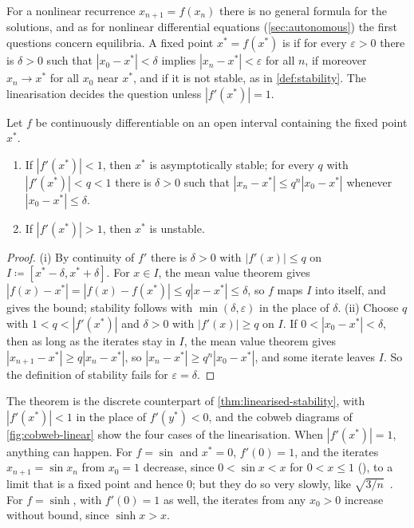 For a nonlinear recurrence $x_{n+1}=f(x_n)$ there is no general formula for the solutions, and as for nonlinear differential equations (\cref{sec:autonomous}) the first questions concern equilibria. A fixed point $x^*=f(x^*)$ is  if for every $\varepsilon>0$ there is $\delta>0$ such that $|x_0-x^*|<\delta$ implies $|x_n-x^*|<\varepsilon$ for all $n$,  if moreover $x_n\to x^*$ for all $x_0$ near $x^*$, and  if it is not stable, as in \cref{def:stability}. The linearisation decides the question unless $|f'(x^*)|=1$.

\begin{theorem}
\label{thm:map-linearised}
Let $f$ be continuously differentiable on an open interval containing the fixed point $x^*$.
\begin{enumerate}
\item If $|f'(x^*)|<1$, then $x^*$ is asymptotically stable; for every $q$ with $|f'(x^*)|<q<1$ there is $\delta>0$ such that $|x_n-x^*|\le q^n|x_0-x^*|$ whenever $|x_0-x^*|\le\delta$.
\item If $|f'(x^*)|>1$, then $x^*$ is unstable.
\end{enumerate}
\end{theorem}

\begin{proof}
(i) By continuity of $f'$ there is $\delta>0$ with $|f'(x)|\le q$ on $I\coloneqq[x^*-\delta,x^*+\delta]$. For $x\in I$, the mean value theorem gives $|f(x)-x^*|=|f(x)-f(x^*)|\le q|x-x^*|\le\delta$, so $f$ maps $I$ into itself, and  gives the bound; stability follows with $\min(\delta,\varepsilon)$ in the place of $\delta$. (ii) Choose $q$ with $1<q<|f'(x^*)|$ and $\delta>0$ with $|f'(x)|\ge q$ on $I$. If $0<|x_0-x^*|<\delta$, then as long as the iterates stay in $I$, the mean value theorem gives $|x_{n+1}-x^*|\ge q|x_n-x^*|$, so $|x_n-x^*|\ge q^n|x_0-x^*|$, and some iterate leaves $I$. So the definition of stability fails for $\varepsilon=\delta$.
\end{proof}

The theorem is the discrete counterpart of \cref{thm:linearised-stability}, with $|f'(x^*)|<1$ in the place of $f'(y^*)<0$, and the cobweb diagrams of \cref{fig:cobweb-linear} show the four cases of the linearisation. When $|f'(x^*)|=1$, anything can happen. For $f=\sin$ and $x^*=0$, $f'(0)=1$, and the iterates $x_{n+1}=\sin x_n$ from $x_0=1$ decrease, since $0<\sin x<x$ for $0<x\le1$ (), to a limit that is a fixed point and hence $0$; but they do so very slowly, like $\sqrt{3/n}$~\cite[Chap.~8]{debruijn1981}. For $f=\sinh$, with $f'(0)=1$ as well, the iterates from any $x_0>0$ increase without bound, since $\sinh x>x$.

